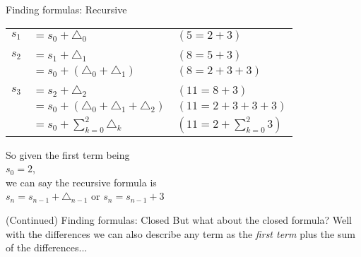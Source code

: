 {\begin{intro}{Finding formulas: Recursive}
        \begin{center}
            \begin{tabular}{c l | l}
                $s_{1}$ &   $= s_{0} + \triangle_{0}$                       & $(5 = 2 + 3)$
                \\ \\
                $s_{2}$ &   $= s_{1} + \triangle_{1}$                       & $(8 = 5 + 3)$
                \\
                &           $= s_{0} + (\triangle_{0} + \triangle_{1})$     & $(8 = 2 + 3 + 3)$
                \\ \\
                $s_{3}$ &   $= s_{2} + \triangle_{2}$                       & $(11 = 8 + 3)$
                \\
                &           $= s_{0} + (\triangle_{0} + \triangle_{1} + \triangle_{2})$ & $(11 = 2 + 3 + 3 + 3)$
                \\
                &           $= s_{0} + \sum_{k=0}^{2}{ \triangle_{k} }$     & $(11 = 2 + \sum_{k=0}^{2}{3})$
            \end{tabular}
        \end{center}

        \begin{center}
            So given the first term being \\
            $s_{0} = 2$,
            \\ we can say the recursive formula is \\
            $s_{n} = s_{n-1} + \triangle_{n-1}$ \tab or \tab
            $s_{n} = s_{n-1} + 3$
        \end{center}
        
    \end{intro}

    \newpage

    \begin{intro}{(Continued) Finding formulas: Closed}
        But what about the closed formula? Well with the differences
        we can also describe any term as the \textit{first term} plus
        the sum of the differences...
        

\end{intro}}
